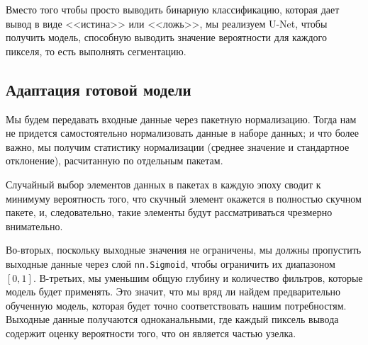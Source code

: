 \documentclass[%
	11pt,
	a4paper,
	utf8,
		]{article}
\begin{document}
Вместо того чтобы просто выводить бинарную классификацию, которая дает вывод в виде <<истина>> или <<ложь>>, мы реализуем U-Net, чтобы получить модель, способную выводить значение вероятности для каждого пикселя, то есть выполнять сегментацию.

\subsection{Адаптация готовой модели}

Мы будем передавать входные данные через пакетную нормализацию. Тогда нам не придется самостоятельно нормализовать данные в наборе данных; и что более важно, мы получим статистику нормализации (среднее значение и стандартное отклонение), расчитанную по отдельным пакетам. 

Случайный выбор элементов данных в пакетах в каждую эпоху сводит к минимуму вероятность того, что скучный элемент окажется в полностью скучном пакете, и, следовательно, такие элементы будут рассматриваться чрезмерно внимательно.

Во-вторых, поскольку выходные значения не ограничены, мы должны пропустить выходные данные через слой \verb|nn.Sigmoid|, чтобы ограничить их диапазоном $[0, 1]$. В-третьих, мы уменьшим общую глубину и количество фильтров, которые модель будет применять. Это значит, что мы вряд ли найдем предварительно обученную модель, которая будет точно соответствовать нашим потребностям. Выходные данные получаются одноканальными, где каждый пиксель вывода содержит оценку вероятности того, что он является частью узелка.






\begin{thebibliography}{99}
	
\end{thebibliography}


\end{document}
